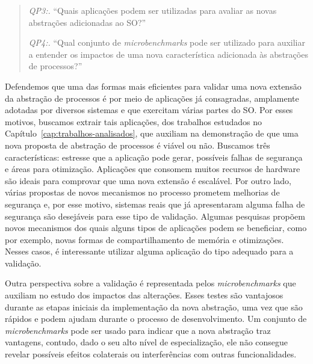 \begin{quote}
  \item \emph{QP3:.} ``Quais aplicações podem ser utilizadas para avaliar as novas abstrações adicionadas ao SO?''
  \item \emph{QP4:.} ``Qual conjunto de \emph{microbenchmarks} pode ser utilizado para auxiliar a entender os impactos de uma nova característica adicionada às abstrações de processos?''
\end{quote}




Defendemos que uma das formas mais eficientes para validar uma nova extensão da
abstração de processos é por meio de aplicações já consagradas, amplamente adotadas por
diversos sistemas e que exercitam várias partes do SO. Por esses motivos,
buscamos extrair tais aplicações, dos trabalhos estudados no
Capítulo~\ref{cap:trabalhos-analisados}, que auxiliam na demonstração de que uma nova
proposta de abstração de processos é viável ou não. Buscamos três
características: estresse que a aplicação pode gerar, possíveis falhas de
segurança e áreas para otimização. Aplicações que consomem muitos recursos de
hardware são ideais para comprovar que uma nova extensão é escalável. Por outro
lado, várias propostas de novos mecanismos no processo prometem melhorias de
segurança e, por esse motivo, sistemas reais que já apresentaram alguma falha
de segurança são desejáveis para esse tipo de validação. Algumas pesquisas
propõem novos mecanismos dos quais alguns tipos de aplicações podem se
beneficiar, como por exemplo, novas formas de compartilhamento de memória e
otimizações. Nesses casos, é interessante utilizar alguma aplicação do tipo
adequado para a validação.

Outra perspectiva sobre a validação é representada pelos \emph{microbenchmarks}
que auxiliam no estudo dos impactos das alterações.  Esses testes são
vantajosos durante as etapas iniciais da implementação da nova abstração, uma
vez que são rápidos e podem ajudam durante o processo de desenvolvimento. Um
conjunto de \emph{microbenchmarks} pode ser usado para indicar que a nova
abstração traz vantagens, contudo, dado o seu alto nível de especialização, ele
não consegue revelar possíveis efeitos colaterais ou interferências com outras
funcionalidades.

